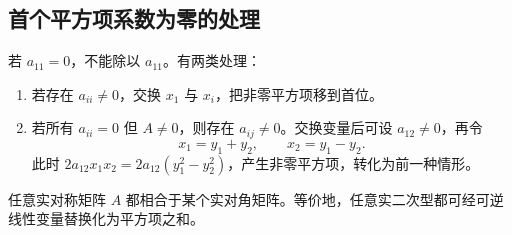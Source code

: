 \subsection{首个平方项系数为零的处理}

若 $a_{11}=0$，不能除以 $a_{11}$。有两类处理：
\begin{enumerate}
\item 若存在 $a_{ii}\ne0$，交换 $x_1$ 与 $x_i$，把非零平方项移到首位。
\item 若所有 $a_{ii}=0$ 但 $A\ne0$，则存在 $a_{ij}\ne0$。交换变量后可设 $a_{12}\ne0$，再令
\[
x_1=y_1+y_2,\qquad x_2=y_1-y_2.
\]
此时 $2a_{12}x_1x_2=2a_{12}(y_1^2-y_2^2)$，产生非零平方项，转化为前一种情形。
\end{enumerate}

\begin{theorem}[对称矩阵的相合对角化]
任意实对称矩阵 $A$ 都相合于某个实对角矩阵。等价地，任意实二次型都可经可逆线性变量替换化为平方项之和。
\end{theorem}
